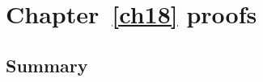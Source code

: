 \chapter{Chapter~\ref{ch18} proofs}

\newpage
\section{Summary}\label{ch18.ps.summary}
\lpscriptsummary
